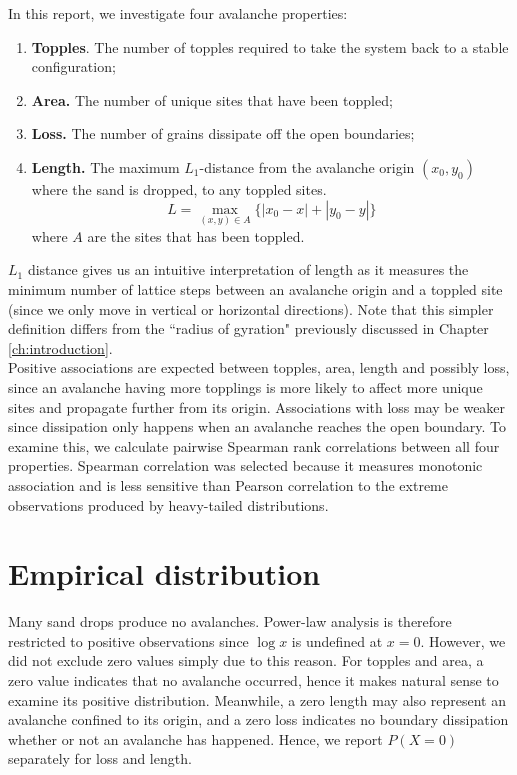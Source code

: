 In this report, we investigate four avalanche properties:
\begin{enumerate}
    \item \textbf{Topples}. The number of topples required to take the system back to a stable configuration;
    \item \textbf{Area.} The number of unique sites that have been toppled;
    \item \textbf{Loss.} The number of grains dissipate off the open boundaries;
    \item \textbf{Length.} The maximum $L_1$-distance from the avalanche origin $(x_0, y_0)$ where the sand is dropped, to any toppled sites.
    \[
    L=\max_{(x,y) \in A}\{|x_0-x|+|y_0-y|\}
    \]where $A$ are the sites that has been toppled.

\end{enumerate}

$L_1$ distance gives us an intuitive interpretation of length as it measures the minimum number of lattice steps between an avalanche origin and a toppled site (since we only move in vertical or horizontal directions). Note that this simpler definition differs from the ``radius of gyration" previously discussed in Chapter \ref{ch:introduction}.\\

Positive associations are expected between topples, area, length and possibly loss, since an avalanche having more topplings is more likely to affect more unique sites and propagate further from its origin. Associations with loss may be weaker since dissipation only happens when an avalanche reaches the open boundary. To examine this, we calculate pairwise Spearman rank correlations between all four properties. Spearman correlation \cite{Spearman1904} was selected because it measures monotonic association and is less sensitive than Pearson correlation to the extreme observations produced by heavy-tailed distributions.

\section{Empirical distribution}\label{sec:empirical}

Many sand drops produce no avalanches. Power-law analysis is therefore restricted to positive observations since $\log x$ is undefined at $x=0$. However, we did not exclude zero values simply due to this reason. For topples and area, a zero value indicates that no avalanche occurred, hence it makes natural sense to examine its positive distribution. Meanwhile, a zero length may also represent an avalanche confined to its origin, and a zero loss indicates no boundary dissipation whether or not an avalanche has happened. Hence, we report $P(X=0)$ separately for loss and length.\\

